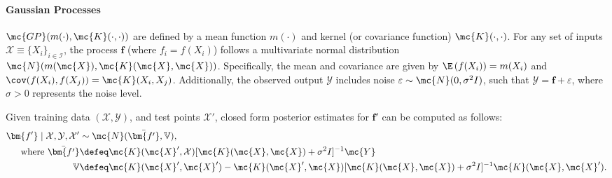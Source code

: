 \vspace{-10pt}
\paragraph{Gaussian Processes} $\mc{GP}(m(\cdot), \mc{K}(\cdot,\cdot))$ are defined by a mean function $m(\cdot)$ and kernel (or covariance function) $\mc{K}(\cdot,\cdot)$. For any set of  inputs $\mathcal{X} \equiv \{X_i\}_{i\in \mathcal{I}}$, the process $\bm{f}$ (where $f_i = {f}(X_i)$) follows a  multivariate normal distribution $\mc{N} (m(\mc{X}), \mc{K}(\mc{X},\mc{X}))$. Specifically, the mean and covariance are given by  $\E\left({f(X_i)}\right)=m(X_i)$  and $\cov(f(X_i), f(X_j)) = \mc{K}(X_i,X_j)$. 
Additionally, the observed output $\mathcal{Y}$ includes noise ${\varepsilon} \sim \mc{N}(0, \sigma^2 I)$, such that  $\mathcal{Y} = \bm{f} + \varepsilon$, where $\sigma > 0$  represents the noise level. %




Given training data $(\mathcal{X}, \mathcal{Y})$, and test points ${\mathcal{X}}'$, closed form posterior estimates for $\bm{{f}'}$ can be computed as follows:
\begin{align*}
\bm{{f}'} \mid {\mathcal{X}, \mathcal{Y}, \mathcal{X}'} & \sim \mc{N}(\bar{\bm{f'}}, \mathbb{V}), \\ 
\text{where }  \bar{\bm{f'}} &\defeq \mc{K}(\mc{X}', \mathcal{X}) [\mc{K}(\mc{X},\mc{X}) + \sigma^2 I]^{-1} \mc{Y} \\ 
\mathbb{V} & \defeq \mc{K}(\mc{X}', \mc{X}') - \mc{K}(\mc{X}', \mc{X}) [\mc{K}(\mc{X},\mc{X}) + \sigma^2 I]^{-1} \mc{K}(\mc{X},\mc{X}').
\end{align*} 




\vspace{-10pt}
